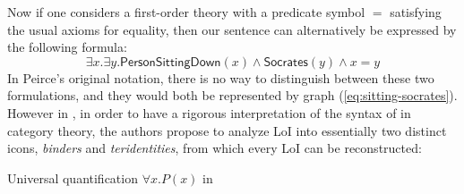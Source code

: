 Now if one considers a first-order theory with a predicate symbol $=$ satisfying
the usual axioms for equality, then our sentence can alternatively be expressed
by the following formula:
\begin{equation}
  \exists x. \exists y. \mathsf{PersonSittingDown}(x) \wedge
  \mathsf{Socrates}(y) \wedge x = y \label{eq:sitting-socrates-fo-eq}
\end{equation}
In Peirce's original notation, there is no way to distinguish between these two
formulations, and they would both be represented by graph
(\ref{eq:sitting-socrates}). However in
, in order to have a rigorous
interpretation of the syntax of  in category theory, the authors
propose to analyze LoI into essentially two distinct icons, \emph{binders} and
\emph{teridentities}, from which every LoI can be reconstructed:

\begin{marginfigure}
  
  \caption{Universal quantification $\forall x. P(x)$ in }
\end{marginfigure}

